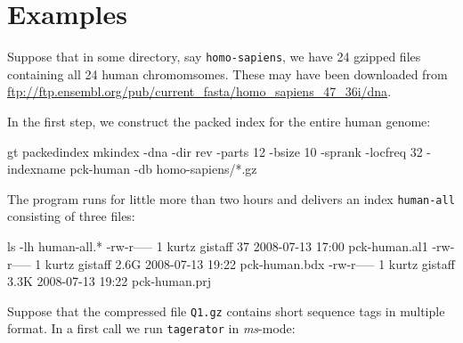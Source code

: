 \documentclass[12pt]{article}
\newcommand{\Program}[0]{\texttt{tagerator}\xspace}
\begin{document}
\section{Examples}
Suppose that in some directory, say \texttt{homo-sapiens}, we have 24 gzipped
\Fasta files containing all 24 human chromomsomes. These may have been 
downloaded from
\url{ftp://ftp.ensembl.org/pub/current_fasta/homo_sapiens_47_36i/dna}.

In the first step, we construct the packed index for the entire human genome:

\begin{Output}
gt packedindex mkindex -dna -dir rev -parts 12 -bsize 10 -sprank -locfreq 32
                       -indexname pck-human -db homo-sapiens/*.gz
\end{Output}

The program runs for little more than two hours and delivers 
an index \texttt{human-all} consisting of three files:

\begin{Output}
ls -lh human-all.*
-rw-r----- 1 kurtz gistaff   37 2008-07-13 17:00 pck-human.al1
-rw-r----- 1 kurtz gistaff 2.6G 2008-07-13 19:22 pck-human.bdx
-rw-r----- 1 kurtz gistaff 3.3K 2008-07-13 19:22 pck-human.prj
\end{Output}

Suppose that the compressed file \texttt{Q1.gz} contains short sequence tags
in multiple \Fasta format. In a first call we run \Program in \textit{ms}-mode:
\end{document}

